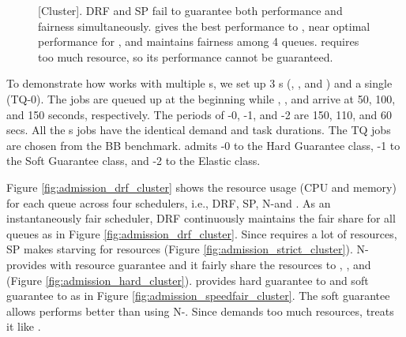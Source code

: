 \begin{figure}[!h]

	\caption{[Cluster]. DRF and SP fail to guarantee both performance and fairness simultaneously. \name gives the best performance to , near optimal performance for , and maintains fairness among 4 queues.  requires too much resource, so its performance cannot be guaranteed.}
	\label{fig:admission_control_cluster}
\end{figure}


To demonstrate how \name works with multiple {\burstq}s, we set up 3 {\burstq}s (, , and ) and a single \batchq (TQ-0).
The jobs  are queued up at the beginning while , , and  arrive at 50, 100, and 150 seconds, respectively.
The periods of {\burstq}-0, {\burstq}-1, and {\burstq}-2 are 150, 110, and 60 secs. All the {\burstq}s jobs have the identical demand and task durations.
The TQ jobs are chosen from the BB benchmark.
\name admits {\burstq}-0 to the Hard Guarantee class, {\burstq}-1 to the Soft Guarantee class, and {\burstq}-2 to the Elastic class.

Figure \ref{fig:admission_drf_cluster} shows the resource usage (CPU and memory) for each queue across four schedulers, i.e., DRF, SP, N-\name and \name.
As an instantaneously fair scheduler, DRF continuously maintains the fair share for all queues as in Figure \ref{fig:admission_drf_cluster}.
Since  requires a lot of resources, SP makes  starving for resources (Figure \ref{fig:admission_strict_cluster}). N-\name provides  with resource guarantee and it fairly share the resources to , , and  (Figure \ref{fig:admission_hard_cluster}).
\name provides hard guarantee to  and soft guarantee to  as in Figure \ref{fig:admission_speedfair_cluster}.
The soft guarantee allows  performs better than using N-\name.
Since  demands too much resources, \name treats it like .

